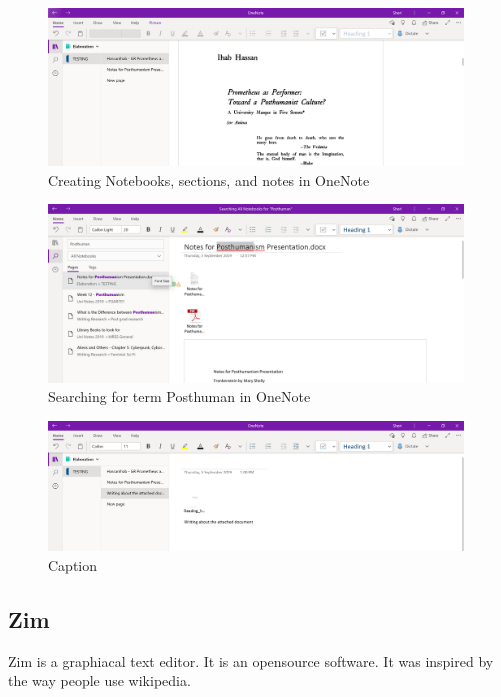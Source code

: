 \documentclass{article}
\begin{document}
\begin{figure}[htbp]
    \centering
    \includegraphics[width=11cm]{Images/OneNoteTest002.PNG}
    \caption{Creating Notebooks, sections, and notes in OneNote}
    \label{fig:OneNote Structure}
\end{figure}

\begin{figure}[htbp]
    \centering
    \includegraphics[width=11cm]{Images/OneNoteTest003.PNG}
    \caption{Searching for term Posthuman in OneNote}
    \label{fig:OneNote Search Posthuman}
\end{figure}

\begin{figure}[htbp]
    \centering
    \includegraphics[width=11cm]{Images/OneNoteTest005.PNG}
    \caption{Caption}
    \label{fig:my_label3}
\end{figure}

\pagebreak

\subsection{Zim}

Zim is a graphiacal text editor. It is an opensource software. It was inspired by the way people use wikipedia.
\end{document}
